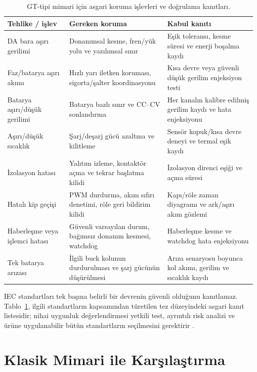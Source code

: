 \begin{table}[H]
  \centering
  \caption{GT-tipi mimari için asgari koruma işlevleri ve doğrulama kanıtları.}
  \label{tab:gt-koruma-dogrulama}
  \small
  \begin{tabularx}{\textwidth}{@{}p{}p{}X@{}}
    \toprule
    Tehlike / işlev & Gereken koruma & Kabul kanıtı \\
    \midrule
    DA bara aşırı gerilimi & Donanımsal kesme, fren/yük yolu ve yazılımsal sınır & Eşik toleransı, kesme süresi ve enerji boşalma kaydı \\
    Faz/batarya aşırı akımı & Hızlı yarı iletken koruması, sigorta/şalter koordinasyonu & Kısa devre veya güvenli düşük gerilim enjeksiyon testi \\
    Batarya aşırı/düşük gerilimi & Batarya bazlı sınır ve CC--CV sonlandırma & Her kanalın kalibre edilmiş gerilim kaydı ve hata enjeksiyonu \\
    Aşırı/düşük sıcaklık & Şarj/deşarj gücü azaltma ve kilitleme & Sensör kopuk/kısa devre deneyi ve termal eşik kaydı \\
    İzolasyon hatası & Yalıtım izleme, kontaktör açma ve tekrar başlatma kilidi & İzolasyon direnci eşiği ve açma süresi \\
    Hatalı kip geçişi & PWM durdurma, akım sıfırı denetimi, röle geri bildirim kilidi & Kapı/röle zaman diyagramı ve ark/aşırı akım gözlemi \\
    Haberleşme veya işlemci hatası & Güvenli varsayılan durum, bağımsız donanım kesmesi, watchdog & Haberleşme kesme ve watchdog hata enjeksiyonu \\
    Tek batarya arızası & İlgili buck kolunun durdurulması ve şarj gücünün düşürülmesi & Arıza senaryosu boyunca kol akımı, gerilim ve sıcaklık kaydı \\
    \bottomrule
  \end{tabularx}
\end{table}

IEC standartları tek başına belirli bir devrenin güvenli olduğunu kanıtlamaz. Tablo~\ref{tab:gt-koruma-dogrulama}, ilgili standartların kapsamından türetilen tez düzeyindeki asgari kanıt listesidir; nihai uygunluk değerlendirmesi yetkili test, ayrıntılı risk analizi ve ürüne uygulanabilir bütün standartların seçilmesini gerektirir \citep{IEC62619,IEC62477,IEC62933_5_2}.

\section{Klasik Mimari ile Karşılaştırma}
\label{sec:gt-karsilastirma}


